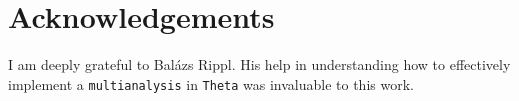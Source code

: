 \chapter*{Acknowledgements}

I am deeply grateful to Balázs Rippl. 
His help in understanding how to effectively implement a \texttt{multianalysis} 
in \texttt{Theta} was invaluable to this work.
